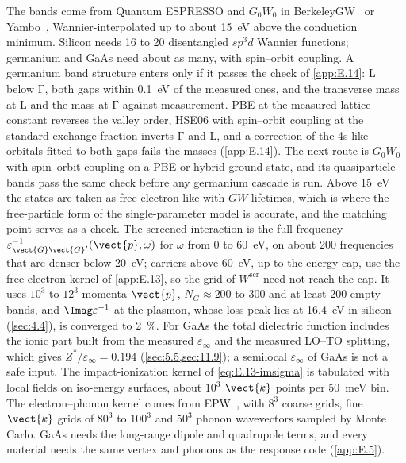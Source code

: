 The bands come from Quantum ESPRESSO and $G_0W_0$ in BerkeleyGW~\cite{deslippe2012berkeleygw} or Yambo~\cite{sangalli2019many}, Wannier-interpolated up to about \SI{15}{eV} above the conduction minimum. Silicon needs 16 to 20 disentangled $sp^3d$ Wannier functions; germanium and GaAs need about as many, with spin--orbit coupling. A germanium band structure enters only if it passes the check of \cref{app:E.14}: L below $\mathrm{\Gamma}$, both gaps within \SI{0.1}{eV} of the measured ones, and the transverse mass at L and the mass at $\mathrm{\Gamma}$ against measurement. PBE at the measured lattice constant reverses the valley order, HSE06 with spin--orbit coupling at the standard exchange fraction inverts $\mathrm{\Gamma}$ and L, and a correction of the 4s-like orbitals fitted to both gaps fails the masses (\cref{app:E.14}). The next route is $G_0W_0$ with spin--orbit coupling on a PBE or hybrid ground state, and its quasiparticle bands pass the same check before any germanium cascade is run. Above \SI{15}{eV} the states are taken as free-electron-like with $GW$ lifetimes, which is where the free-particle form of the single-parameter model is accurate, and the matching point serves as a check. The screened interaction is the full-frequency $\varepsilon^{-1}_{\vect{G}\vect{G}'}(\vect{p}, \omega)$ for $\omega$ from 0 to \SI{60}{eV}, on about 200 frequencies that are denser below \SI{20}{eV}; carriers above \SI{60}{eV}, up to the energy cap, use the free-electron kernel of \cref{app:E.13}, so the grid of $W^{\mathrm{scr}}$ need not reach the cap. It uses $10^3$ to $12^3$ momenta $\vect{p}$, $N_G \approx 200$ to 300 and at least 200 empty bands, and $\Imag\varepsilon^{-1}$ at the plasmon, whose loss peak lies at \SI{16.4}{eV} in silicon (\cref{sec:4.4}), is converged to \SI{2}{\percent}. For GaAs the total dielectric function includes the ionic part built from the measured $\varepsilon_\infty$ and the measured LO--TO splitting, which gives $Z^*/\varepsilon_\infty = 0.194$ (\cref{sec:5.5,sec:11.9}); a semilocal $\varepsilon_\infty$ of GaAs is not a safe input. The impact-ionization kernel of \cref{eq:E.13-imsigma} is tabulated with local fields on iso-energy surfaces, about $10^3$ $\vect{k}$ points per \SI{50}{meV} bin. The electron--phonon kernel comes from EPW~\cite{ponce2016epw}, with $8^3$ coarse grids, fine $\vect{k}$ grids of $80^3$ to $100^3$ and $50^3$ phonon wavevectors sampled by Monte Carlo. GaAs needs the long-range dipole and quadrupole terms, and every material needs the same vertex and phonons as the response code (\cref{app:E.5}).

